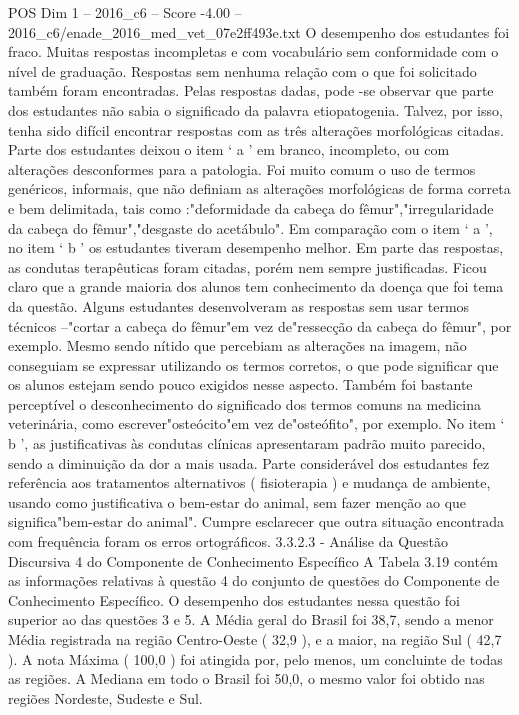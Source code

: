 \begin{textsample}{POS Dim 1 – 2016\_c6 – Score -4.00 – 2016\_c6/enade\_2016\_med\_vet\_07e2ff493e.txt}
O desempenho dos estudantes foi fraco.
Muitas respostas incompletas e com vocabulário sem conformidade com o nível de graduação.
Respostas sem nenhuma relação com o que foi solicitado também foram encontradas.
Pelas respostas dadas, pode -se observar que parte dos estudantes não sabia o significado da palavra etiopatogenia.
Talvez, por isso, tenha sido difícil encontrar respostas com as três alterações morfológicas citadas.
Parte dos estudantes deixou o item ‘ a ’ em branco, incompleto, ou com alterações desconformes para a patologia.
Foi muito comum o uso de termos genéricos, informais, que não definiam as alterações morfológicas de forma correta e bem delimitada, tais como :"deformidade da cabeça do fêmur","irregularidade da cabeça do fêmur","desgaste do acetábulo".
Em comparação com o item ‘ a ’, no item ‘ b ’ os estudantes tiveram desempenho melhor.
Em parte das respostas, as condutas terapêuticas foram citadas, porém nem sempre justificadas.
Ficou claro que a grande maioria dos alunos tem conhecimento da doença que foi tema da questão.
Alguns estudantes desenvolveram as respostas sem usar termos técnicos –"cortar a cabeça do fêmur"em vez de"ressecção da cabeça do fêmur", por exemplo.
Mesmo sendo nítido que percebiam as alterações na imagem, não conseguiam se expressar utilizando os termos corretos, o que pode significar que os alunos estejam sendo pouco exigidos nesse aspecto.
Também foi bastante perceptível o desconhecimento do significado dos termos comuns na medicina veterinária, como escrever"osteócito"em vez de"osteófito", por exemplo.
No item ‘ b ’, as justificativas às condutas clínicas apresentaram padrão muito parecido, sendo a diminuição da dor a mais usada.
Parte considerável dos estudantes fez referência aos tratamentos alternativos ( fisioterapia ) e mudança de ambiente, usando como justificativa o bem-estar do animal, sem fazer menção ao que significa"bem-estar do animal".
Cumpre esclarecer que outra situação encontrada com frequência foram os erros ortográficos. 3.3.2.3 - Análise da Questão Discursiva 4 do Componente de Conhecimento Específico A Tabela 3.19 contém as informações relativas à questão 4 do conjunto de questões do Componente de Conhecimento Específico.
O desempenho dos estudantes nessa questão foi superior ao das questões 3 e 5.
A Média geral do Brasil foi 38,7, sendo a menor Média registrada na região Centro-Oeste ( 32,9 ), e a maior, na região Sul ( 42,7 ).
A nota Máxima ( 100,0 ) foi atingida por, pelo menos, um concluinte de todas as regiões.
A Mediana em todo o Brasil foi 50,0, o mesmo valor foi obtido nas regiões Nordeste, Sudeste e Sul.

\end{textsample}
